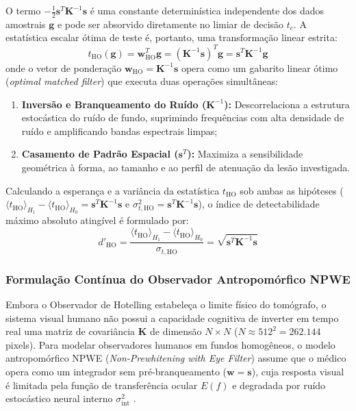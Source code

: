 \documentclass[
  12pt,
  a4paper,
  oneside
]{report}
\begin{document}
O termo $-\frac{1}{2} \mathbf{s}^T \mathbf{K}^{-1} \mathbf{s}$ é uma constante determinística independente dos dados amostrais $\mathbf{g}$ e pode ser absorvido diretamente no limiar de decisão $t_c$. A estatística escalar ótima de teste é, portanto, uma transformação linear estrita:
\begin{equation}
  t_{\text{HO}}(\mathbf{g}) = \mathbf{w}_{\text{HO}}^T \mathbf{g} = \left( \mathbf{K}^{-1} \mathbf{s} \right)^T \mathbf{g} = \mathbf{s}^T \mathbf{K}^{-1} \mathbf{g}
  \label{eq:hotelling_template_deducao}
\end{equation}
onde o vetor de ponderação $\mathbf{w}_{\text{HO}} = \mathbf{K}^{-1} \mathbf{s}$ opera como um gabarito linear ótimo (\emph{optimal matched filter}) que executa duas operações simultâneas:
\begin{enumerate}
  \item \textbf{Inversão e Branqueamento do Ruído ($\mathbf{K}^{-1}$):} Descorrelaciona a estrutura estocástica do ruído de fundo, suprimindo frequências com alta densidade de ruído e amplificando bandas espectrais limpas;
  \item \textbf{Casamento de Padrão Espacial ($\mathbf{s}^T$):} Maximiza a sensibilidade geométrica à forma, ao tamanho e ao perfil de atenuação da lesão investigada.
\end{enumerate}

Calculando a esperança e a variância da estatística $t_{\text{HO}}$ sob ambas as hipóteses ($\langle t_{\text{HO}} \rangle_{H_1} - \langle t_{\text{HO}} \rangle_{H_0} = \mathbf{s}^T \mathbf{K}^{-1} \mathbf{s}$ e $\sigma_{t,\text{HO}}^2 = \mathbf{s}^T \mathbf{K}^{-1} \mathbf{s}$), o índice de detectabilidade máximo absoluto atingível é formulado por:
\begin{equation}
  d'_{\text{HO}} = \frac{\langle t_{\text{HO}} \rangle_{H_1} - \langle t_{\text{HO}} \rangle_{H_0}}{\sigma_{t,\text{HO}}} = \sqrt{\mathbf{s}^T \mathbf{K}^{-1} \mathbf{s}}
  \label{eq:dprime_hotelling_teto}
\end{equation}

\subsubsection{Formulação Contínua do Observador Antropomórfico NPWE}
Embora o Observador de Hotelling estabeleça o limite físico do tomógrafo, o sistema visual humano não possui a capacidade cognitiva de inverter em tempo real uma matriz de covariância $\mathbf{K}$ de dimensão $N \times N$ ($N \approx 512^2 = 262.144$ pixels). Para modelar observadores humanos em fundos homogêneos, o modelo antropomórfico NPWE (\emph{Non-Prewhitening with Eye Filter}) assume que o médico opera como um integrador sem pré-branqueamento ($\mathbf{w} = \mathbf{s}$), cuja resposta visual é limitada pela função de transferência ocular $E(f)$ e degradada por ruído estocástico neural interno $\sigma_{\text{int}}^2$ \cite{burgess1994, eckstein2000}.
\end{document}
